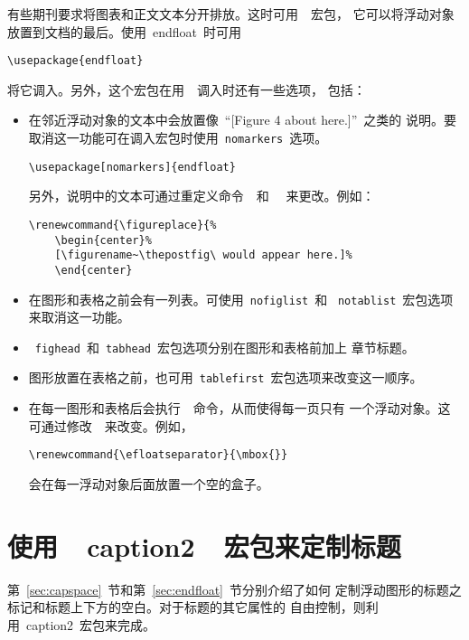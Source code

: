 有些期刊要求将图表和正文文本分开排放。这时可用~~宏包，
它可以将浮动对象放置到文档的最后。使用~\textsf{endfloat}~时可用
\begin{Verbatim}[xleftmargin=1cm]
\usepackage{endfloat}
\end{Verbatim}
将它调入。另外，这个宏包在用~~调入时还有一些选项，
包括：
\begin{itemize}
	\item 在邻近浮动对象的文本中会放置像~``[Figure 4 about here.]''~之类的
	说明。要取消这一功能可在调入宏包时使用~\texttt{nomarkers}~选项。
	\begin{Verbatim}[xleftmargin=1cm]
	\usepackage[nomarkers]{endfloat}
	\end{Verbatim}
	另外，说明中的文本可通过重定义命令~~和~~
	来更改。例如：
	\begin{Verbatim}[xleftmargin=1cm]
	\renewcommand{\figureplace}{% 
	\begin{center}% 
	[\figurename~\thepostfig\ would appear here.]% 
	\end{center}
	\end{Verbatim}
	\item 在图形和表格之前会有一列表。可使用~\texttt{nofiglist}~和
	~\texttt{notablist}~宏包选项来取消这一功能。
	\item ~\texttt{fighead}~和~\texttt{tabhead}~宏包选项分别在图形和表格前加上
	章节标题。
	\item 图形放置在表格之前，也可用~\texttt{tablefirst}~宏包选项来改变这一顺序。
	\item 在每一图形和表格后会执行~~命令，从而使得每一页只有
	一个浮动对象。这可通过修改~~来改变。例如，
	\begin{Verbatim}[xleftmargin=1cm]
	\renewcommand{\efloatseparator}{\mbox{}}
	\end{Verbatim}
	会在每一浮动对象后面放置一个空的盒子。
\end{itemize}

\section{使用~~caption2~~宏包来定制标题}\label{sec:caption2}

第~\ref{sec:capspace}~节和第~\ref{sec:endfloat}~节分别介绍了如何
定制浮动图形的标题之标记和标题上下方的空白。对于标题的其它属性的
自由控制，则利用~\textsf{caption2}~宏包来完成。


